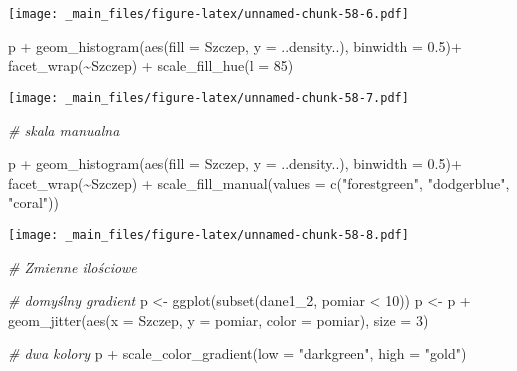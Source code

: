\documentclass[
]{book}
\newenvironment{Shaded}{\begin{snugshade}}{\end{snugshade}}
\newcommand{\AttributeTok}[1]{\textcolor[rgb]{0.77,0.63,0.00}{#1}}
\newcommand{\CommentTok}[1]{\textcolor[rgb]{0.56,0.35,0.01}{\textit{#1}}}
\newcommand{\DecValTok}[1]{\textcolor[rgb]{0.00,0.00,0.81}{#1}}
\newcommand{\FloatTok}[1]{\textcolor[rgb]{0.00,0.00,0.81}{#1}}
\newcommand{\FunctionTok}[1]{\textcolor[rgb]{0.00,0.00,0.00}{#1}}
\newcommand{\NormalTok}[1]{#1}
\newcommand{\OtherTok}[1]{\textcolor[rgb]{0.56,0.35,0.01}{#1}}
\newcommand{\SpecialCharTok}[1]{\textcolor[rgb]{0.00,0.00,0.00}{#1}}
\newcommand{\StringTok}[1]{\textcolor[rgb]{0.31,0.60,0.02}{#1}}
\begin{document}
\texttt{[image: \_main\_files/figure-latex/unnamed-chunk-58-6.pdf]}

\begin{Shaded}
\begin{Highlighting}[]
\NormalTok{p }\SpecialCharTok{+} \FunctionTok{geom\_histogram}\NormalTok{(}\FunctionTok{aes}\NormalTok{(}\AttributeTok{fill =}\NormalTok{ Szczep, }\AttributeTok{y =}\NormalTok{ ..density..), }\AttributeTok{binwidth =} \FloatTok{0.5}\NormalTok{)}\SpecialCharTok{+}
  \FunctionTok{facet\_wrap}\NormalTok{(}\SpecialCharTok{\textasciitilde{}}\NormalTok{Szczep) }\SpecialCharTok{+} \FunctionTok{scale\_fill\_hue}\NormalTok{(}\AttributeTok{l =} \DecValTok{85}\NormalTok{)}
\end{Highlighting}
\end{Shaded}

\texttt{[image: \_main\_files/figure-latex/unnamed-chunk-58-7.pdf]}

\begin{Shaded}
\begin{Highlighting}[]
\CommentTok{\# skala manualna}

\NormalTok{p }\SpecialCharTok{+} \FunctionTok{geom\_histogram}\NormalTok{(}\FunctionTok{aes}\NormalTok{(}\AttributeTok{fill =}\NormalTok{ Szczep, }\AttributeTok{y =}\NormalTok{ ..density..), }\AttributeTok{binwidth =} \FloatTok{0.5}\NormalTok{)}\SpecialCharTok{+}
  \FunctionTok{facet\_wrap}\NormalTok{(}\SpecialCharTok{\textasciitilde{}}\NormalTok{Szczep) }\SpecialCharTok{+} \FunctionTok{scale\_fill\_manual}\NormalTok{(}\AttributeTok{values =} \FunctionTok{c}\NormalTok{(}\StringTok{"forestgreen"}\NormalTok{, }\StringTok{"dodgerblue"}\NormalTok{, }\StringTok{"coral"}\NormalTok{))}
\end{Highlighting}
\end{Shaded}

\texttt{[image: \_main\_files/figure-latex/unnamed-chunk-58-8.pdf]}

\begin{Shaded}
\begin{Highlighting}[]
\CommentTok{\# Zmienne ilościowe}

\CommentTok{\# domyślny gradient}
\NormalTok{p }\OtherTok{\textless{}{-}} \FunctionTok{ggplot}\NormalTok{(}\FunctionTok{subset}\NormalTok{(dane1\_2, pomiar }\SpecialCharTok{\textless{}} \DecValTok{10}\NormalTok{))}
\NormalTok{p  }\OtherTok{\textless{}{-}}\NormalTok{ p }\SpecialCharTok{+} \FunctionTok{geom\_jitter}\NormalTok{(}\FunctionTok{aes}\NormalTok{(}\AttributeTok{x =}\NormalTok{ Szczep, }\AttributeTok{y =}\NormalTok{ pomiar, }\AttributeTok{color =}\NormalTok{ pomiar), }\AttributeTok{size =} \DecValTok{3}\NormalTok{)}

\CommentTok{\# dwa kolory}
\NormalTok{p }\SpecialCharTok{+} \FunctionTok{scale\_color\_gradient}\NormalTok{(}\AttributeTok{low =} \StringTok{"darkgreen"}\NormalTok{, }\AttributeTok{high =} \StringTok{"gold"}\NormalTok{)}
\end{Highlighting}
\end{Shaded}
\end{document}
